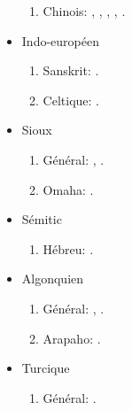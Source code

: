 \documentclass[oldfontcommands,oneside,a4paper,11pt]{article}
\newcommand{\langue}[2]{#2}
\begin{document}
\begin{itemize}
\begin{enumerate}
\item \langue{Chinese}{Chinois}:  \citet{jacques00ywij},  \citet{jacques03dissimilation}, \citet{jacques15sr},   \citet{jacques2015genetic}, \citet{jacques2015traditional}.
\end{enumerate}
\item \langue{Indo-European}{Indo-européen}
\begin{enumerate}
\item Sanskrit: \citet{jacques13vama}.
\item \langue{Celtic}{Celtique}: \citet{michaud-jacques12nasalite}.
\end{enumerate}
\item \langue{Siouan}{Sioux}
\begin{enumerate}
\item \langue{General}{Général}: \citet{jacques12bear},      \citet{michaud-jacques12nasalite}.  
\item Omaha: \citet{jacques16ebde}.
\end{enumerate}
\item \langue{Semitic}{Sémitic}
\begin{enumerate}
\item \langue{Hebrew}{Hébreu}: \citet{rg-gj12yod}.
\end{enumerate}
\item \langue{Algonquian}{Algonquien}
\begin{enumerate}
\item \langue{General}{Général}: \citet{jacques12bear}, \citet{jacques14inverse}.
\item Arapaho: \citet{jacques13arapaho}.
\end{enumerate}
\item  \langue{Turkic}{Turcique}
\begin{enumerate}
\item  \langue{General}{Général}: \citet{antonov12kumush}.
\end{enumerate}
\end{itemize} 
 
\end{document}
